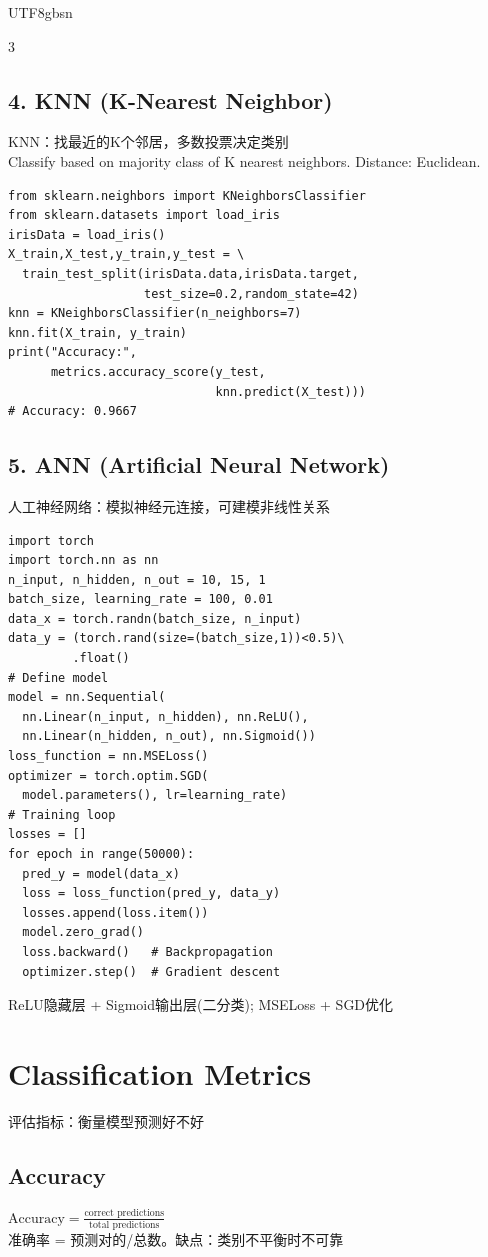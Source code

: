 \documentclass[9pt,landscape,a4paper]{article}
\newcommand{\zhint}[1]{{\scriptsize\color{gray!70!black}#1}}
\begin{document}
\begin{CJK}{UTF8}{gbsn}
\begin{multicols}{3}
\subsection{4. KNN (K-Nearest Neighbor)}
\zhint{KNN：找最近的K个邻居，多数投票决定类别}\\
Classify based on majority class of K nearest neighbors. Distance: Euclidean.

\begin{lstlisting}
from sklearn.neighbors import KNeighborsClassifier
from sklearn.datasets import load_iris
irisData = load_iris()
X_train,X_test,y_train,y_test = \
  train_test_split(irisData.data,irisData.target,
                   test_size=0.2,random_state=42)
knn = KNeighborsClassifier(n_neighbors=7)
knn.fit(X_train, y_train)
print("Accuracy:",
      metrics.accuracy_score(y_test,
                             knn.predict(X_test)))
# Accuracy: 0.9667
\end{lstlisting}

\subsection{5. ANN (Artificial Neural Network)}
\zhint{人工神经网络：模拟神经元连接，可建模非线性关系}

\begin{lstlisting}
import torch
import torch.nn as nn
n_input, n_hidden, n_out = 10, 15, 1
batch_size, learning_rate = 100, 0.01
data_x = torch.randn(batch_size, n_input)
data_y = (torch.rand(size=(batch_size,1))<0.5)\
         .float()
# Define model
model = nn.Sequential(
  nn.Linear(n_input, n_hidden), nn.ReLU(),
  nn.Linear(n_hidden, n_out), nn.Sigmoid())
loss_function = nn.MSELoss()
optimizer = torch.optim.SGD(
  model.parameters(), lr=learning_rate)
# Training loop
losses = []
for epoch in range(50000):
  pred_y = model(data_x)
  loss = loss_function(pred_y, data_y)
  losses.append(loss.item())
  model.zero_grad()
  loss.backward()   # Backpropagation
  optimizer.step()  # Gradient descent
\end{lstlisting}
\zhint{ReLU隐藏层 + Sigmoid输出层(二分类); MSELoss + SGD优化}

\section{Classification Metrics}
\zhint{评估指标：衡量模型预测好不好}

\subsection{Accuracy}
$\text{Accuracy} = \frac{\text{correct predictions}}{\text{total predictions}}$\\
\zhint{准确率 = 预测对的/总数。缺点：类别不平衡时不可靠}


\end{multicols}
\end{CJK}
\end{document}
